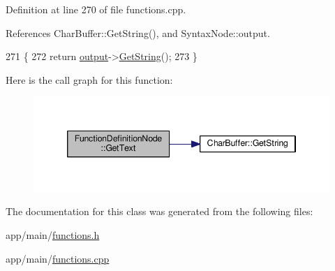 Definition at line 270 of file functions.\+cpp.



References Char\+Buffer\+::\+Get\+String(), and Syntax\+Node\+::output.


\begin{DoxyCode}
271 \{
272     \textcolor{keywordflow}{return} \hyperlink{classSyntaxNode_a1180628cbe3fce43930cee0df5a9ce5c}{output}->\hyperlink{classCharBuffer_a7dfd3feaaf80f318ba44efe15b1ec44b}{GetString}();
273 \}
\end{DoxyCode}


Here is the call graph for this function\+:
\nopagebreak
\begin{figure}[H]
\begin{center}
\leavevmode
\includegraphics[width=346pt]{da/dec/classFunctionDefinitionNode_a36b853a90870fab9f1dbebeaa9b9cc18_cgraph}
\end{center}
\end{figure}




The documentation for this class was generated from the following files\+:\begin{DoxyCompactItemize}
\item 
app/main/\hyperlink{functions_8h}{functions.\+h}\item 
app/main/\hyperlink{functions_8cpp}{functions.\+cpp}\end{DoxyCompactItemize}
